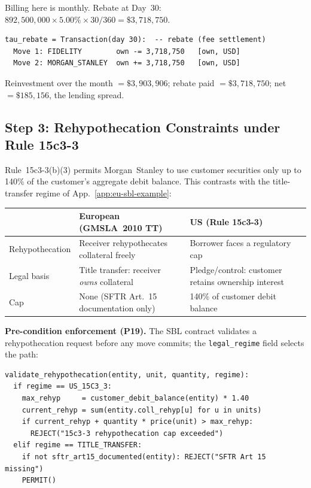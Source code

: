 \documentclass[11pt,a4paper]{article}
\begin{document}
\noindent Billing here is monthly. Rebate at Day~30: $892{,}500{,}000 \times 5.00\% \times 30/360 = \$3{,}718{,}750$.

\begin{lstlisting}
tau_rebate = Transaction(day 30):  -- rebate (fee settlement)
  Move 1: FIDELITY        own -= 3,718,750   [own, USD]
  Move 2: MORGAN_STANLEY  own += 3,718,750   [own, USD]
\end{lstlisting}

\noindent Reinvestment over the month $= \$3{,}903{,}906$; rebate paid $= \$3{,}718{,}750$; net $= \$185{,}156$, the lending spread.

\subsection{Step 3: Rehypothecation Constraints under Rule 15c3-3}
\label{sec:us-step3}

Rule~15c3-3(b)(3) permits Morgan~Stanley to use customer securities only up to 140\% of the customer's aggregate debit balance. This contrasts with the title-transfer regime of App.~\ref{app:eu-sbl-example}:

\begin{center}\small
\begin{tabular}{l p{5cm} p{5cm}}
\toprule
& \textbf{European (GMSLA~2010 TT)} & \textbf{US (Rule 15c3-3)} \\
\midrule
Rehypothecation & Receiver rehypothecates collateral freely & Borrower faces a regulatory cap \\
Legal basis & Title transfer: receiver \emph{owns} collateral & Pledge/control: customer retains ownership interest \\
Cap & None (SFTR Art.~15 documentation only) & 140\% of customer debit balance \\
\bottomrule
\end{tabular}
\end{center}

\noindent\textbf{Pre-condition enforcement (P19).} The SBL contract validates a rehypothecation request before any move commits; the \texttt{legal\_regime} field selects the path:

\begin{lstlisting}
validate_rehypothecation(entity, unit, quantity, regime):
  if regime == US_15C3_3:
    max_rehyp     = customer_debit_balance(entity) * 1.40
    current_rehyp = sum(entity.coll_rehyp[u] for u in units)
    if current_rehyp + quantity * price(unit) > max_rehyp:
      REJECT("15c3-3 rehypothecation cap exceeded")
  elif regime == TITLE_TRANSFER:
    if not sftr_art15_documented(entity): REJECT("SFTR Art 15 missing")
    PERMIT()
\end{lstlisting}
\end{document}
